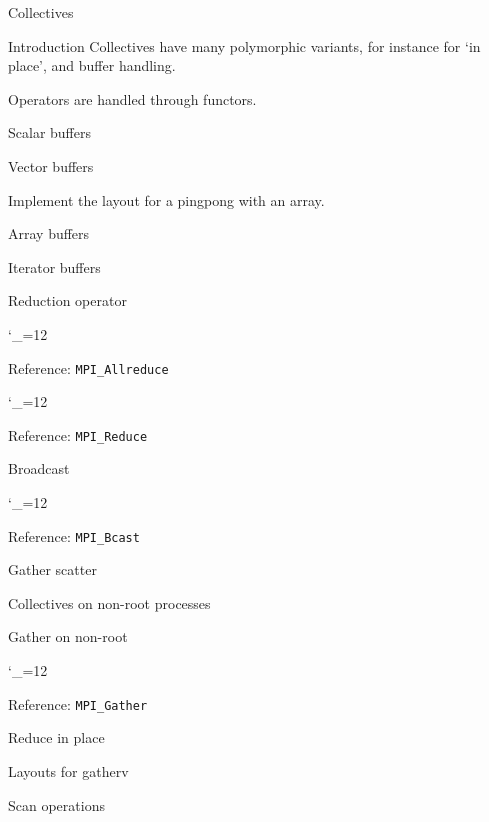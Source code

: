 \documentclass[10pt]{beamer}
\newcommand\referenceframe{\begingroup\catcode`\_=12 \referenceframett}
\gdef\referenceframett#1{
  \begin{numberedframe}{Reference: \texttt{MPI_#1}}
    \small
    
  \end{numberedframe}\endgroup}
\begin{document}
 {Collectives}

\begin{frame}{Introduction}
  Collectives have many polymorphic variants, for instance for `in place',
  and buffer handling.

  Operators are handled through functors.
\end{frame}
\begin{numberedframe}{Scalar buffers}
  
\end{numberedframe}
\begin{numberedframe}{Vector buffers}
  
\end{numberedframe}
\begin{exerciseframe}[pingpongbuffer]
  Implement the layout for a pingpong with an array.
\end{exerciseframe}
\begin{numberedframe}{Array buffers}
  
\end{numberedframe}
\begin{numberedframe}{Iterator buffers}
  
\end{numberedframe}

\begin{numberedframe}{Reduction operator}
  
\end{numberedframe}
\referenceframe{Allreduce}
\referenceframe{Reduce}
\begin{numberedframe}{Broadcast}
  
\end{numberedframe}
\referenceframe{Bcast}
\begin{numberedframe}{Gather scatter}
  
\end{numberedframe}
\begin{numberedframe}{Collectives on non-root processes}
  
\end{numberedframe}
\begin{numberedframe}{Gather on non-root}
  
\end{numberedframe}
\referenceframe{Gather}
\begin{numberedframe}{Reduce in place}
  \footnotesize
  
\end{numberedframe}
\begin{numberedframe}{Layouts for gatherv}
  
\end{numberedframe}
\begin{numberedframe}{Scan operations}
  
\end{numberedframe}
\end{document}
